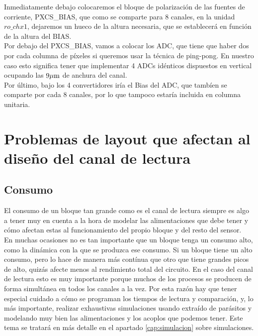 Inmediatamente debajo colocaremos el bloque de polarización de las fuentes de
corriente, PXCS\_BIAS, que como se comparte para 8 canales, en la unidad $ro\_chx1$,
dejaremos un hueco de la altura necesaria, que se establecerá en función de la altura
del BIAS.\\

Por debajo del PXCS\_BIAS, vamos a colocar los ADC, que tiene que haber dos por
cada columna de píxeles si queremos usar la técnica de ping-pong. En nuestro caso
esto significa tener que implementar 4 ADCs idénticos dispuestos en vertical ocupando
las $9\mu\text{m}$ de anchura del canal.\\

Por último, bajo los 4 convertidores iría el Bias del ADC, que tambíen se comparte
por cada 8 canales, por lo que tampoco estaría incluida en columna unitaria.\\

\section{Problemas de layout que afectan al diseño del canal de lectura}

\subsection{Consumo}

El consumo de un bloque tan grande como es el canal de lectura siempre es algo a
tener muy en cuenta a la hora de modelar las alimentaciones que debe tener y
cómo afectan estas al funcionamiento del propio bloque y del resto del sensor.\\

En muchas ocasiones no es tan importante que un bloque tenga un consumo alto,
como la dinámica con la que se produzca ese consumo. Si un bloque tiene un alto
consumo, pero lo hace de manera más contínua que otro que tiene grandes picos de
alto, quizás afecte menos al rendimiento total del circuito. En el caso del
canal de lectura esto es muy importante porque muchos de los procesos se producen
de forma simultánea en todos los canales a la vez. Por esta razón hay que tener
especial cuidado a cómo se programan los tiempos de lectura y comparación,
y, lo más importante, realizar exhaustivas simulaciones usando extraído de parásitos
y modelando muy bien las alimentaciones y los acoplos que podemos tener. Este tema
se tratará en más detalle en el apartado \ref{cap:simulacion} sobre simulaciones.\\

